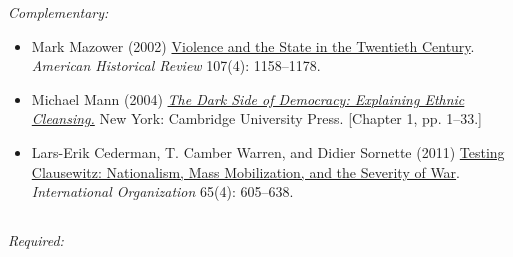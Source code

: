 \documentclass[12pt, a4paper]{article}
\begin{document}
\noindent\textit{Complementary:}

\begin{itemize}
	\item Mark Mazower (2002) \href{https://doi.org/10.1086/ahr/107.4.1158}{Violence and the State in the Twentieth Century}. \textit{American Historical Review} 107(4): 1158--1178.
  \item Michael Mann (2004) \href{https://www.cambridge.org/core/books/dark-side-of-democracy/7E75A132A188A2804E91F4F209B6FE1F}{\textit{The Dark Side of Democracy: Explaining Ethnic Cleansing.}} New York: Cambridge University Press. [Chapter 1, pp. 1--33.]
	\item Lars-Erik Cederman, T.	Camber Warren, and Didier Sornette (2011) \href{https://doi.org/10.1017/S0020818311000245}{Testing Clausewitz: Nationalism, Mass Mobilization, and the Severity of War}. \textit{International Organization} 65(4): 605--638.
\end{itemize}

\vspace{20pt}
\hline
\subsection*{{\color{red}{Session 4: Democracy, war, and peace}}}




\noindent\textit{Required:}
\end{document}
